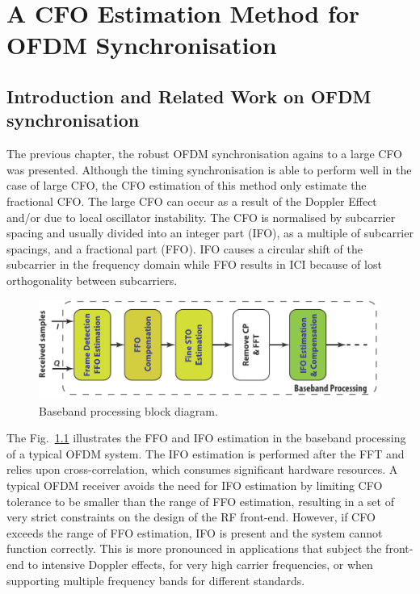 \chapter{A CFO Estimation Method for OFDM Synchronisation}
\label{chap:CFO}

\section{Introduction and Related Work on OFDM synchronisation}
The previous chapter, the robust OFDM synchronisation agains to a large CFO was presented.
Although the timing synchronisation is able to perform well in the case of large CFO,  the CFO estimation of this method only estimate the fractional CFO.
The large CFO can occur as a result of the Doppler Effect and/or due to local oscillator instability.
The CFO is normalised by subcarrier spacing and usually divided into an integer part (IFO), as a multiple of subcarrier spacings, and a fractional part (FFO). 
IFO causes a circular shift of the subcarrier in the frequency domain while FFO results in ICI because of lost orthogonality between subcarriers.
\begin{figure}[b]
    \centerline{\includegraphics [width=0.9\columnwidth] {figures/Baseband.pdf} }
    \caption{Baseband processing block diagram.}
    \label{fig:baseband}
\end{figure}
The Fig.~\ref{fig:baseband} illustrates the FFO and IFO estimation in the baseband processing of a typical OFDM system. 
The IFO estimation is performed after the FFT and relies upon cross-correlation, which consumes significant hardware resources. 
A typical OFDM receiver avoids the need for IFO estimation by limiting CFO tolerance to be smaller than the range of FFO estimation, resulting in a set of very strict constraints on the design of the RF front-end. However, if CFO exceeds the range of FFO estimation, IFO is present and the system cannot function correctly. 
This is more pronounced in applications that subject the front-end to intensive Doppler effects, for very high carrier frequencies, or when supporting multiple frequency bands for different standards.


